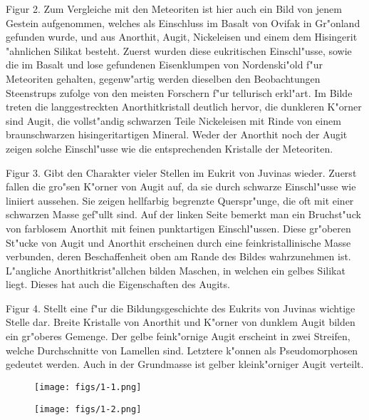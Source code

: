 \documentclass[a4paper, 11pt, oneside, polutonikogreek, german]{article}
\begin{document}
Figur 2. Zum Vergleiche mit den Meteoriten ist hier auch ein Bild von jenem Gestein aufgenommen, welches als Einschluss im Basalt von Ovifak in Gr"onland gefunden wurde, und aus Anorthit, Augit, Nickeleisen und einem dem Hisingerit "ahnlichen Silikat besteht. Zuerst wurden diese eukritischen Einschl"usse, sowie die im Basalt und lose gefundenen Eisenklumpen von Nordenski"old f"ur Meteoriten gehalten, gegenw"artig werden dieselben den Beobachtungen Steenstrups zufolge von den meisten Forschern f"ur tellurisch erkl"art. Im Bilde treten die langgestreckten Anorthitkristall deutlich hervor, die dunkleren K"orner sind Augit, die vollst"andig schwarzen Teile Nickeleisen mit Rinde von einem braunschwarzen hisingeritartigen Mineral. Weder der Anorthit noch der Augit zeigen solche Einschl"usse wie die entsprechenden Kristalle der Meteoriten.

Figur 3. Gibt den Charakter vieler Stellen im Eukrit von Juvinas wieder. Zuerst fallen die gro"sen K"orner von Augit auf, da sie durch schwarze Einschl"usse wie liniiert aussehen. Sie zeigen hellfarbig begrenzte Querspr"unge, die oft mit einer schwarzen Masse gef"ullt sind. Auf der linken Seite bemerkt man ein Bruchst"uck von farblosem Anorthit mit feinen punktartigen Einschl"ussen. Diese gr"oberen St"ucke von Augit und Anorthit erscheinen durch eine feinkristallinische Masse verbunden, deren Beschaffenheit oben am Rande des Bildes wahrzunehmen ist. L"angliche Anorthitkrist"allchen bilden Maschen, in welchen ein gelbes Silikat liegt. Dieses hat auch die Eigenschaften des Augits.

Figur 4. Stellt eine f"ur die Bildungsgeschichte des Eukrits von Juvinas wichtige Stelle dar. Breite Kristalle von Anorthit und K"orner von dunklem Augit bilden ein gr"oberes Gemenge. Der gelbe feink"ornige Augit erscheint in zwei Streifen, welche Durchschnitte von Lamellen sind. Letztere k"onnen als Pseudomorphosen gedeutet werden. Auch in der Grundmasse ist gelber kleink"orniger Augit verteilt.
\clearpage

\vspace*{\fill}
\begin{figure}[H]
\centering
\texttt{[image: figs/1-1.png]}
\caption{}
\end{figure}
\vspace*{\fill}
\clearpage

\vspace*{\fill}
\begin{figure}[H]
\centering
\texttt{[image: figs/1-2.png]}
\caption{}
\end{figure}
\vspace*{\fill}
\clearpage
\end{document}
